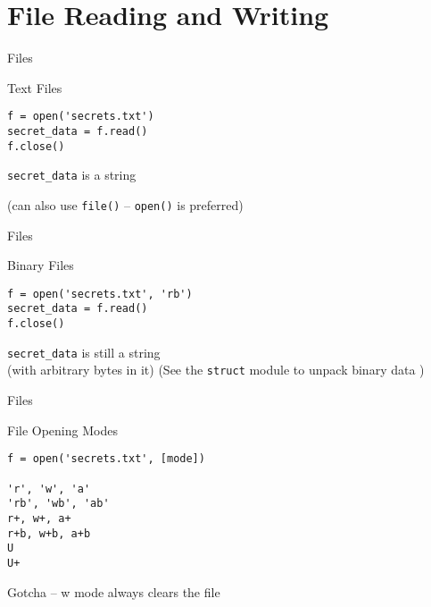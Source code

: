 \documentclass{beamer}
\begin{document}
\section{File Reading and Writing}

\begin{frame}[fragile]{Files}

{\Large Text Files}

\begin{verbatim}
f = open('secrets.txt')
secret_data = f.read()
f.close()
\end{verbatim}

{\Large \verb|secret_data| is a string}

\vfill
(can also use \verb|file()| -- \verb|open()| is preferred)
\end{frame}

\begin{frame}[fragile]{Files}

{\Large Binary Files}

\begin{verbatim}
f = open('secrets.txt', 'rb')
secret_data = f.read()
f.close()
\end{verbatim}

{\Large \verb|secret_data| is still a string \\[.1in]
(with arbitrary bytes in it)}
\vfill
(See the \verb|struct| module to unpack binary data )
\end{frame}

\begin{frame}[fragile]{Files}

{\Large File Opening Modes}
\vfill
\begin{verbatim}
f = open('secrets.txt', [mode])

'r', 'w', 'a'
'rb', 'wb', 'ab'
r+, w+, a+
r+b, w+b, a+b
U
U+
\end{verbatim}
\vfill
{\Large Gotcha -- w mode always clears the file}
\end{frame}
\end{document}

